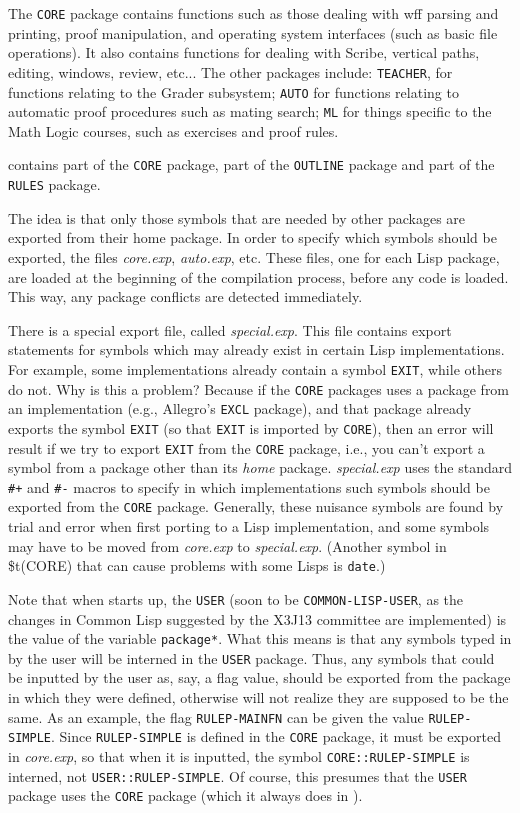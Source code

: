 The {\tt CORE}
package contains functions such as those dealing with wff parsing and
printing, proof manipulation, and operating system interfaces (such as
basic file operations). It also contains functions for dealing with 
Scribe, vertical paths, editing, windows, review, etc... 
The other packages include: {\tt TEACHER}, for functions relating to the Grader
subsystem; {\tt AUTO} for functions relating to automatic proof
procedures such as mating search; {\tt ML} for things specific to the
Math Logic courses, such as exercises and proof rules.

\ETPS contains part of the {\tt CORE} package, part of the {\tt OUTLINE}
package and part of the {\tt RULES} package.

The idea is that only those symbols that are needed by other packages are
exported from their home package. In order to specify which symbols
should be exported, the files {\it core.exp}, {\it auto.exp}, etc.  These
files, one for each Lisp package, are loaded at the beginning of the
compilation process, before any code is loaded.  This way, any package
conflicts are detected immediately.

There is a special export file, called {\it special.exp}.  This file
contains export statements for symbols which may already exist in
certain Lisp implementations.  For example, some implementations already
contain a symbol {\tt EXIT}, while others do not.  Why is this a
problem?  Because if the {\tt CORE} packages uses a package from an
implementation (e.g., Allegro's {\tt EXCL} package), and that package
already exports the symbol {\tt EXIT} (so that {\tt EXIT} is imported by
{\tt CORE}),  then an error will result if we
try to export {\tt EXIT} from the {\tt CORE} package, i.e., you can't
export a symbol from a package other than its {\it home} package.
{\it special.exp} uses the
standard {\tt \#+} and {\tt \#-} macros to specify in which implementations
such symbols should be exported from the {\tt CORE} package.  Generally,
these nuisance symbols are found by trial and error when first porting
\TPS to a Lisp implementation, and some symbols may have to be moved
from {\it core.exp} to {\it special.exp}. (Another symbol in \$t(CORE) that can
cause problems with some Lisps is {\tt date}.)

Note that when \TPS starts up, the {\tt USER} (soon to be
{\tt COMMON-LISP-USER}, as the changes in Common Lisp suggested by the
X3J13 committee are implemented) is the value of the variable
{\tt *package*}.  What this means is that any symbols typed in by the
\TPS user will be interned in the {\tt USER} package.  Thus, any symbols
that could be inputted by the user as, say, a flag value, should be
exported from the package in which they were defined, otherwise \TPS
will  not realize they are supposed to be the same.  As an example,
the flag {\tt RULEP-MAINFN} can be given the value {\tt RULEP-SIMPLE}.
Since {\tt RULEP-SIMPLE} is defined in the {\tt CORE} package, it must be
exported in {\it core.exp}, so that when it is inputted, the symbol
{\tt CORE::RULEP-SIMPLE} is interned, not {\tt USER::RULEP-SIMPLE}.  Of
course, this presumes that the {\tt USER} package uses the {\tt CORE}
package (which it always does in \TPS).

